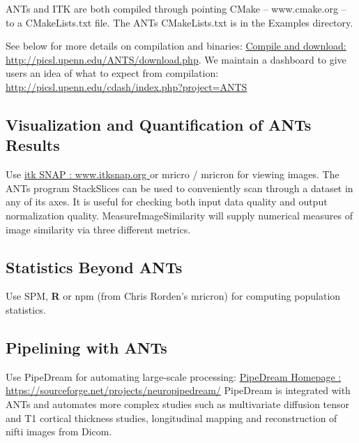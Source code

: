 \documentclass{InsightArticle}
\begin{document}
ANTs and ITK are both compiled through pointing CMake -- www.cmake.org
-- to a CMakeLists.txt file.  The ANTs CMakeLists.txt is in the
Examples directory.  

See below for more details on compilation and binaries: \newline
\href{http://picsl.upenn.edu/ANTS/download.php}{Compile and download: http://picsl.upenn.edu/ANTS/download.php}.
We maintain a dashboard to give users an idea of what to expect 
from compilation:\newline
\href{http://picsl.upenn.edu/cdash/index.php?project=ANTS}{http://picsl.upenn.edu/cdash/index.php?project=ANTS}


\subsection{Visualization and Quantification of ANTs Results}
Use \href{www.itksnap.org}{itk SNAP : www.itksnap.org } or mricro / mricron for viewing
images.  The ANTs program StackSlices can be used to conveniently scan
through a dataset in any of its axes.  It is useful for checking both
input data quality and output normalization quality.  MeasureImageSimilarity 
will supply numerical measures of image similarity via three different metrics. 

\subsection{Statistics Beyond ANTs}
Use SPM, {\bf R} or npm (from Chris Rorden's mricron) for computing population statistics.

\subsection{Pipelining with ANTs}
Use PipeDream for automating large-scale processing:\newline
\href{https://sourceforge.net/projects/neuropipedream/}{PipeDream
  Homepage :
  https://sourceforge.net/projects/neuropipedream/} \newline PipeDream
is integrated with ANTs and automates more complex studies such as
multivariate diffusion tensor and T1 cortical thickness studies,
longitudinal mapping and reconstruction of nifti images from Dicom.
\newpage
\end{document}
